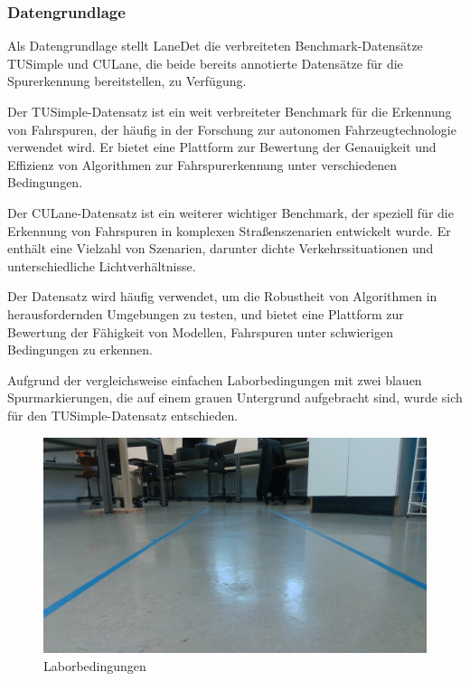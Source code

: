 \documentclass{article}
\begin{document}
            \subsubsection{Datengrundlage}
                Als Datengrundlage stellt LaneDet die verbreiteten Benchmark-Datensätze TUSimple  und CULane, die beide bereits annotierte Datensätze für die Spurerkennung bereitstellen, zu Verfügung.
                
                Der TUSimple-Datensatz ist ein weit verbreiteter Benchmark für die Erkennung von Fahrspuren, der häufig in der Forschung zur autonomen Fahrzeugtechnologie verwendet wird. Er bietet eine Plattform zur Bewertung der Genauigkeit und Effizienz von Algorithmen zur Fahrspurerkennung unter verschiedenen Bedingungen.
                \cite{Long2021The} \cite{Lee2021Robust} \cite{Liu2024Fast}

                Der CULane-Datensatz ist ein weiterer wichtiger Benchmark, der speziell für die Erkennung von Fahrspuren in komplexen Straßenszenarien entwickelt wurde. Er enthält eine Vielzahl von Szenarien, darunter dichte Verkehrssituationen und unterschiedliche Lichtverhältnisse.
                \cite{Long2021The} \cite{Lee2021Robust} \cite{Zhou2024Unsupervised}

                Der Datensatz wird häufig verwendet, um die Robustheit von Algorithmen in herausfordernden Umgebungen zu testen, und bietet eine Plattform zur Bewertung der Fähigkeit von Modellen, Fahrspuren unter schwierigen Bedingungen zu erkennen.
                \cite{Zhao2024StructLane} \cite{Lin2021Semi-Supervised}

                Aufgrund der vergleichsweise einfachen Laborbedingungen mit zwei blauen Spurmarkierungen, die auf einem grauen Untergrund aufgebracht sind, wurde sich für den TUSimple-Datensatz entschieden.

                \begin{figure}[h!]
                    \includegraphics[width=\linewidth]{Laborbedingungen.jpg}
                    \caption{Laborbedingungen}
                    \label{fig:Laborbedingungen}
                \end{figure}
\end{document}
